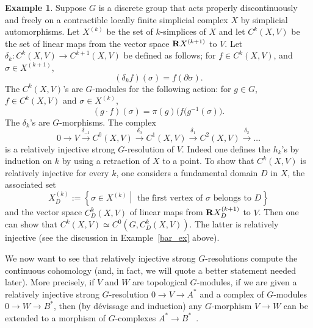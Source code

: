 \documentclass[11pt]{article}
\theoremstyle{definition}
\newtheorem{exam}[theo]{Example}
\numberwithin{equation}{section}
\numberwithin{figure}{section}
\numberwithin{table}{section}
\begin{document}
\begin{exam}\label{simplicial_ex}
Suppose $G$ is a discrete group that acts properly discontinuously and freely on a contractible locally finite simplicial complex $X$ by simplicial automorphisms. Let $X^{(k)}$ be the set of $k$-simplices of $X$ and let $C^k (X, V)$ be the set of linear maps from the vector space ${\bf R} X^{(k+1)}$ to $V$. Let $\delta _k: C^k (X, V) \to C^{k+1} (X,V)$ be defined as follows; for $f \in C^k (X, V)$, and $\sigma \in X^{(k+1)}$,
\[
(\delta _k f)(\sigma) = f(\partial \sigma).
\]
The $C^k (X, V)$'s are $G$-modules for the following action: for $g \in G$, $f \in C^k(X,V)$ and $\sigma \in X^{(k)}$,
\[
(g \cdot f) (\sigma) = \pi (g) \bigl(f(g^{-1}(\sigma)\bigl).
\]
The $\delta _k$'s are $G$-morphisms. The complex
\[
0 \to V \stackrel{\delta_{-1}}{\to} C^0(X,V) \stackrel{\delta_0}{\to} C^1(X,V) \stackrel{\delta_1}{\to} C^2(X,V) \stackrel{\delta_2}{\to}\dots
\]
is a relatively injective strong $G$-resolution of $V$. Indeed one defines the $h_k$'s by induction on $k$ by using a retraction of $X$ to a point. To show that $C^k (X, V)$ is relatively injective for every $k$, one considers a fundamental domain $D$ in $X$, the associated set
\[
X_D^{(k)}:= \left\{\sigma \in X^{(k)} \middle|\text{ the first vertex of } \sigma \text{ belongs to } D\right\}
\]
and the vector space $C_D ^k (X,V)$ of linear maps from ${\bf R} X _D ^{(k+1)}$ to $V$. Then one can show that $C^k(X,V) \simeq C^0(G, C_D ^k (X,V))$. The latter is relatively injective (see the discussion in Example~\ref{bar_ex} above).
\end{exam}


We now want to see that relatively injective strong $G$-resolutions compute the continuous cohomology (and, in fact, we will quote a better statement needed later). More precisely, if $V$ and $W$ are topological $G$-modules, if we are given a relatively injective strong $G$-resolution $0 \to V \to A^*$ and a complex of $G$-modules\linebreak$0 \to W\to B^*$, then (by dévissage and induction) any $G$-morphism $V \to W$ can be extended to a morphism of $G$-complexes $A^* \to B^*$~\cite[Chapter~III, \textsection~1, Proposition~1.1 p.~177]{Gui}.
\end{document}

